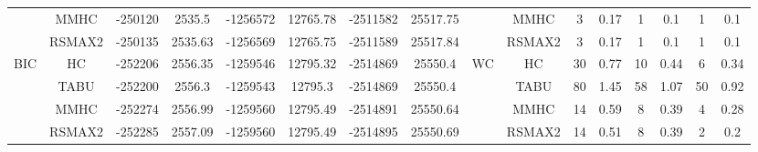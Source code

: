 \begin{table}[p]
{\begin{tabular}{cc||cc|cc|cc||cc|cc|cc|cc}
& MMHC &	-250120 & 	2535.5 & 	-1256572 & 	12765.78 & 	-2511582 & 	25517.75 & 	& MMHC &	3 & 	0.17 & 	1 & 	0.1 & 	1 & 	0.1\tabularnewline													
& RSMAX2 &	-250135 & 	2535.63 & 	-1256569 & 	12765.75 & 	-2511589 & 	25517.84 & 	& RSMAX2 &	3 & 	0.17 & 	1 & 	0.1 & 	1 & 	0.1\tabularnewline													
\hline																										
\multirow{4}{*}{BIC} & HC &	-252206 & 	2556.35 & 	-1259546 & 	12795.32 & 	-2514869 & 	25550.4 & 	\multirow{4}{*}{WC} & HC &	30 & 	0.77 & 	10 & 	0.44 & 	6 & 	0.34\tabularnewline													
& TABU &	-252200 & 	2556.3 & 	-1259543 & 	12795.3 & 	-2514869 & 	25550.4 & 	& TABU &	80 & 	1.45 & 	58 & 	1.07 & 	50 & 	0.92\tabularnewline													
& MMHC &	-252274 & 	2556.99 & 	-1259560 & 	12795.49 & 	-2514891 & 	25550.64 & 	& MMHC &	14 & 	0.59 & 	8 & 	0.39 & 	4 & 	0.28\tabularnewline													
& RSMAX2 &	-252285 & 	2557.09 & 	-1259560 & 	12795.49 & 	-2514895 & 	25550.69 & 	& RSMAX2 &	14 & 	0.51 & 	8 & 	0.39 & 	2 & 	0.2\tabularnewline													
\hline																										
\end{tabular}																										
}																										
\end{table}																										
